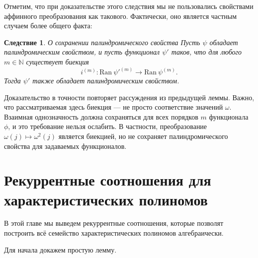 \documentclass[14pt, a4paper, russian]{report}
\newtheorem{corollary}{\indent Следствие}
\begin{document}
Отметим, что при доказательстве этого следствия мы не пользовались свойствами аффинного преобразования как такового. Фактически, оно является частным случаем более общего факта:
\begin{corollary}{О сохранении палиндромического свойства}
Пусть $\psi$ обладает палиндромическим свойством, и пусть функционал $\psi'$ таков, что для любого $m \in \mathbb{N}$ существует биекция $$i^{(m)}: \mathrm{Ran}\ \psi'^{(m)} \rightarrow \mathrm {Ran}\ \psi^{(m)}.$$ Тогда $\psi'$ также обладает палиндромическим свойством.
\end{corollary}
Доказательство в точности повторяет рассуждения из предыдущей леммы. Важно, что рассматриваемая здесь биекция --- не просто соответствие значений $\omega$. Взаимная однозначность должна сохраняться для всех порядков $m$ функционала $\phi$, и это требование нельзя ослабить. В частности, преобразование $\omega(j) \mapsto \omega^2(j)$ является биекцией, но не сохраняет палиндромического свойства для задаваемых функционалов.

\chapter{Рекуррентные соотношения для характеристических полиномов}

В этой главе мы выведем рекуррентные соотношения, которые позволят построить всё семейство характеристических полиномов алгебраически.

Для начала докажем простую лемму.
\end{document}
